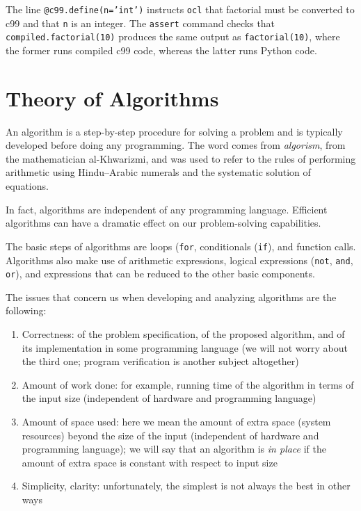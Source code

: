 \documentclass[justified,sixbynine]{tufte-book}
\def\ft{\small\tt}
\theoremstyle{plain}%
\theoremstyle{definition}
\theoremstyle{remark}
\begin{document}
\begin{fullwidth}
The line {\ft @c99.define(n='int')} instructs {\ft ocl} that factorial must be converted to c99 and that {\ft n} is an integer. The {\ft assert} command checks that {\ft compiled.factorial(10)} produces the same output as {\ft factorial(10)}, where the former runs compiled c99 code, whereas the latter runs Python code.

\chapter{Theory of Algorithms}

An algorithm is a step-by-step procedure for solving a problem and is typically developed before doing any programming.
The word comes from {\it algorism}, from the mathematician al-Khwarizmi, and was used to refer to the rules of performing arithmetic using Hindu--Arabic numerals and the systematic solution of equations.

In fact, algorithms are independent
of any programming language. Efficient algorithms can have a dramatic effect
on our problem-solving capabilities.

The basic steps of algorithms are loops ({\ft for}, conditionals ({\ft if}), and function calls.
Algorithms also make use of arithmetic expressions, logical expressions ({\ft not}, {\ft and}, {\ft or}), and expressions that can be reduced to the other basic components.

The issues that concern us when developing and analyzing algorithms are the following:

\begin{enumerate}
\item  Correctness: of the problem specification, of the proposed algorithm,
and of its implementation in some programming language (we will not worry
about the third one; program verification is another subject altogether)

\item  Amount of work done: for example, running time of the algorithm in terms of
the input size (independent of hardware and programming language)

\item  Amount of space used: here we mean the amount of extra space (system resources) beyond
the size of the input (independent of hardware and programming language);
we will say that an algorithm is {\em in place} if the amount of extra space
is constant with respect to input size

\item  Simplicity, clarity: unfortunately, the simplest is not always the
best in other ways


\end{enumerate}
\end{fullwidth}
\end{document}
